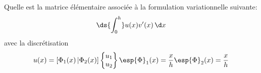 \bexo

Quelle est la matrice élémentaire associée à la formulation variationnelle suivante:
\begin{equation}
	\ds{\int_{0}^h} u(x)v'(x)\,\d x 
\end{equation}
avec la discrétisation
\begin{equation}
	u(x)=[{\Phi}_1(x)\, | {\Phi}_2(x)]
	\begin{Bmatrix}
		{u}_1\\
		{u}_2
	\end{Bmatrix}
\esp	{\Phi}_1(x)=\dfrac{x}{h} \esp {\Phi}_2(x)=\dfrac{x}{h}
\end{equation}

\eexo

\solution{

}